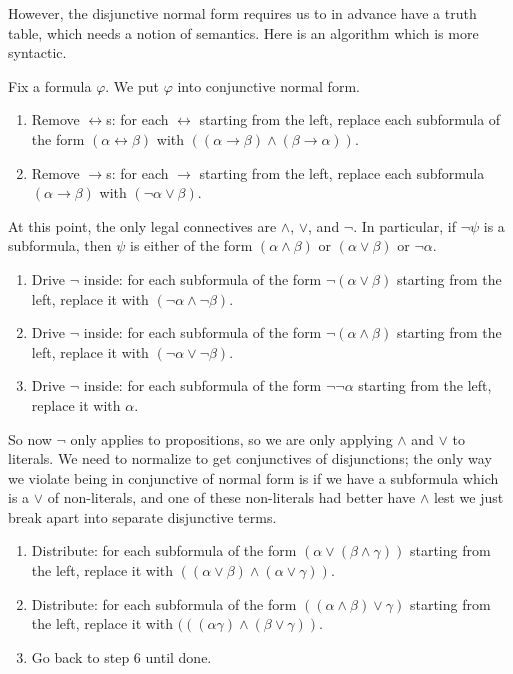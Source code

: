 However, the disjunctive normal form requires us to in advance have a truth table, which needs a notion of semantics. Here is an algorithm which is more syntactic.
\begin{prop}
	Fix a formula $\varphi$. We put $\varphi$ into conjunctive normal form.
	\begin{enumerate}
		\item Remove $\leftrightarrow$s: for each $\leftrightarrow$ starting from the left, replace each subformula of the form $(\alpha\leftrightarrow\beta)$ with $((\alpha\to\beta)\land(\beta\to\alpha))$.
		\item Remove $\to$s: for each $\to$ starting from the left, replace each subformula $(\alpha\to\beta)$ with $(\lnot\alpha\lor\beta)$.
	\end{enumerate}
	At this point, the only legal connectives are $\land$, $\lor$, and $\lnot$. In particular, if $\lnot\psi$ is a subformula, then $\psi$ is either of the form $(\alpha\land\beta)$ or $(\alpha\lor\beta)$ or $\lnot\alpha$.
	\begin{enumerate}[resume]
		\item Drive $\lnot$ inside: for each subformula of the form $\lnot(\alpha\lor\beta)$ starting from the left, replace it with $(\lnot\alpha\land\lnot\beta)$.
		\item Drive $\lnot$ inside: for each subformula of the form $\lnot(\alpha\land\beta)$ starting from the left, replace it with $(\lnot\alpha\lor\lnot\beta)$.
		\item Drive $\lnot$ inside: for each subformula of the form $\lnot\lnot\alpha$ starting from the left, replace it with $\alpha$.
	\end{enumerate}
	So now $\lnot$ only applies to propositions, so we are only applying $\land$ and $\lor$ to literals. We need to normalize to get conjunctives of disjunctions; the only way we violate being in conjunctive of normal form is if we have a subformula which is a $\lor$ of non-literals, and one of these non-literals had better have $\land$ lest we just break apart into separate disjunctive terms.
	\begin{enumerate}[resume]
		\item Distribute: for each subformula of the form $(\alpha\lor(\beta\land\gamma))$ starting from the left, replace it with $((\alpha\lor\beta)\land(\alpha\lor\gamma))$.
		\item Distribute: for each subformula of the form $((\alpha\land\beta)\lor\gamma)$ starting from the left, replace it with $(((\alpha\gamma)\land(\beta\lor\gamma))$.
		\item Go back to step 6 until done.
	\end{enumerate}
\end{prop}
